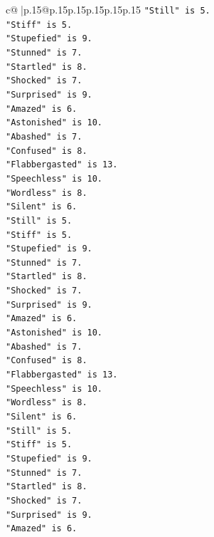 \documentclass{article}
\begin{document}
{\begin{supertabular}{c@{$\;$}|p{.15\linewidth}@{}p{.15\linewidth}p{.15\linewidth}p{.15\linewidth}p{.15\linewidth}p{.15\linewidth}}
{{{\texttt{"Still" is 5.} \\
\texttt{"Stiff" is 5.} \\
\texttt{"Stupefied" is 9.} \\
\texttt{"Stunned" is 7.} \\
\texttt{"Startled" is 8.} \\
\texttt{"Shocked" is 7.} \\
\texttt{"Surprised" is 9.} \\
\texttt{"Amazed" is 6.} \\
\texttt{"Astonished" is 10.} \\
\texttt{"Abashed" is 7.} \\
\texttt{"Confused" is 8.} \\
\texttt{"Flabbergasted" is 13.} \\
\texttt{"Speechless" is 10.} \\
\texttt{"Wordless" is 8.} \\
\texttt{"Silent" is 6.} \\
\texttt{"Still" is 5.} \\
\texttt{"Stiff" is 5.} \\
\texttt{"Stupefied" is 9.} \\
\texttt{"Stunned" is 7.} \\
\texttt{"Startled" is 8.} \\
\texttt{"Shocked" is 7.} \\
\texttt{"Surprised" is 9.} \\
\texttt{"Amazed" is 6.} \\
\texttt{"Astonished" is 10.} \\
\texttt{"Abashed" is 7.} \\
\texttt{"Confused" is 8.} \\
\texttt{"Flabbergasted" is 13.} \\
\texttt{"Speechless" is 10.} \\
\texttt{"Wordless" is 8.} \\
\texttt{"Silent" is 6.} \\
\texttt{"Still" is 5.} \\
\texttt{"Stiff" is 5.} \\
\texttt{"Stupefied" is 9.} \\
\texttt{"Stunned" is 7.} \\
\texttt{"Startled" is 8.} \\
\texttt{"Shocked" is 7.} \\
\texttt{"Surprised" is 9.} \\
\texttt{"Amazed" is 6.} \\
}}}
\end{supertabular}}
\end{document}
